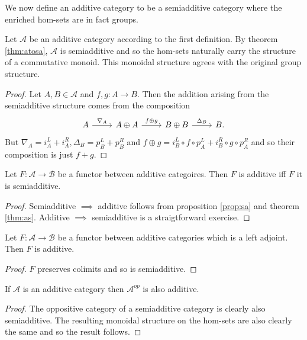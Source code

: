 \documentclass{memoir}
\begin{document}
We now define an additive category to be a semiadditive category where the enriched hom-sets are in fact groups.
\begin{thm}
    \label{thm:as}
    Let $\mathcal A$ be an additive category according to the first definition. 
    By theorem \ref{thm:atosa}, $\mathcal A$ is semiadditive and so the hom-sets naturally carry the structure of a commutative monoid.
    This monoidal structure agrees with the original group structure.
\end{thm}
\begin{proof}
    Let $A,B\in\mathcal A$ and $f,g:A\to B$.
    Then the addition arising from the semiadditive structure comes from the composition
    \begin{equation}
        \begin{tikzcd}
            A \arrow[r,"\nabla_A"] & A \oplus A \arrow[r,"f\oplus g"] & B \oplus B \arrow[r,"\Delta_B"] & B.
        \end{tikzcd}
    \end{equation}
    But $\nabla_A = i_A^L+i_A^R,\Delta_B = p_B^L+p_B^R$ and $f\oplus g = i_B^L\circ f\circ p_A^L + i_B^R\circ g\circ p_A^R$ and so their composition is just $f+g$.
\end{proof}
\begin{corollary}
    Let $F:\mathcal A\to \mathcal B$ be a functor between additive categoires. Then $F$ is additive iff $F$ it is semiadditive.
\end{corollary}
\begin{proof}
    Semiadditive $\implies$ additive follows from proposition \ref{prop:sa} and theorem \ref{thm:as}.
    Additive $\implies$ semiadditive is a straigtforward exercise.
\end{proof}
\begin{corollary}
    Let $F:\mathcal A\to\mathcal B$ be a functor between additive categories which is a left adjoint.
    Then $F$ is additive.
\end{corollary}
\begin{proof}
    $F$ preserves colimits and so is semiadditive.
\end{proof}
\begin{corollary}
    If $\mathcal A$ is an additive category then $\mathcal A^{op}$ is also additive.
\end{corollary}
\begin{proof}
    The oppositive category of a semiadditive category is clearly also semiadditive.
    The resulting monoidal structure on the hom-sets are also clearly the same and so the result follows.
\end{proof}
\end{document}
